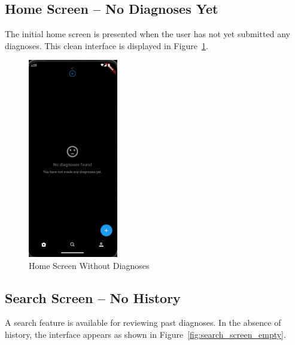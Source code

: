 \subsection{Home Screen – No Diagnoses Yet}

The initial home screen is presented when the user has not yet submitted any diagnoses. This clean interface is displayed in Figure~\ref{fig:home_screen_empty}.

\begin{figure}[H]
    \centering
    \includegraphics[width=0.35\textwidth]{images/UI_Screenshots/home_screen_no_diagnoses.png}
    \caption{Home Screen Without Diagnoses}
    \label{fig:home_screen_empty}
\end{figure}

\subsection{Search Screen – No History}

A search feature is available for reviewing past diagnoses. In the absence of history, the interface appears as shown in Figure~\ref{fig:search_screen_empty}.

